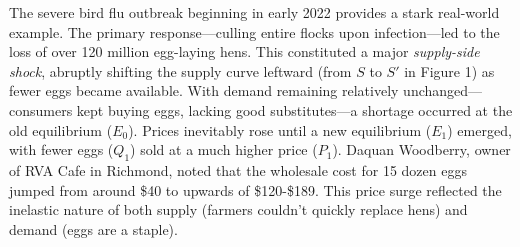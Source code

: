 \documentclass[12pt]{article}
\begin{document}
\begin{doublespace}
The severe bird flu outbreak beginning in early 2022 provides a stark real-world example. The primary response—culling entire flocks upon infection—led to the loss of over 120 million egg-laying hens. This constituted a major \emph{supply-side shock}, abruptly shifting the supply curve leftward (from $S$ to $S'$ in Figure 1) as fewer eggs became available. With demand remaining relatively unchanged—consumers kept buying eggs, lacking good substitutes—a shortage occurred at the old equilibrium ($E_0$). Prices inevitably rose until a new equilibrium ($E_1$) emerged, with fewer eggs ($Q_1$) sold at a much higher price ($P_1$). Daquan Woodberry, owner of RVA Cafe in Richmond, noted that the wholesale cost for 15 dozen eggs jumped from around \$40 to upwards of \$120-\$189. This price surge reflected the inelastic nature of both supply (farmers couldn't quickly replace hens) and demand (eggs are a staple).
\begin{figure}[H]
\centering
{}
\end{figure}
\end{doublespace}
\end{document}
